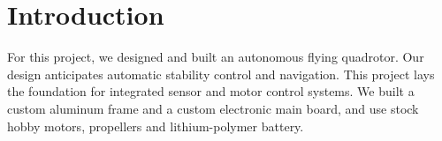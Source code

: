\section{Introduction}

For this project, we designed and built an autonomous flying quadrotor.  Our design anticipates automatic stability control and navigation. This project lays the foundation for integrated sensor and motor control systems.
We built a custom aluminum frame and a custom electronic main board, and use stock hobby motors, propellers and lithium-polymer battery.
